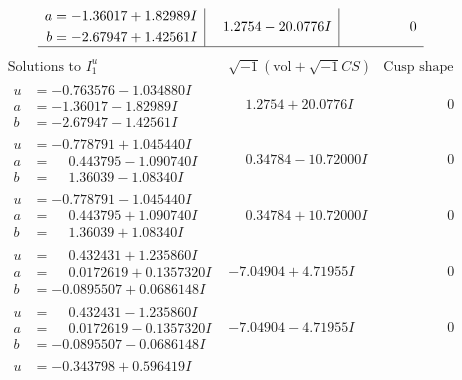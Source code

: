 \documentclass[1p]{elsarticle_modified}
\theoremstyle{definition}
\newcommand{\I}{\sqrt{-1}}
\begin{document}
$$\begin{array}{c|c|c}
\begin{aligned}
a &= -1.36017 + 1.82989 I \\
b &= -2.67947 + 1.42561 I\end{aligned}
 & \phantom{-}1.2754 - 20.0776 I & \phantom{-0.000000 } 0\\
 \hline 
 \end{array}$$\newpage$$\begin{array}{c|c|c}  
\text{Solutions to }I^u_{1}& \I (\text{vol} + \sqrt{-1}CS) & \text{Cusp shape}\\
 \hline 
\begin{aligned}
u &= -0.763576 - 1.034880 I \\
a &= -1.36017 - 1.82989 I \\
b &= -2.67947 - 1.42561 I\end{aligned}
 & \phantom{-}1.2754 + 20.0776 I & \phantom{-0.000000 } 0 \\ \hline\begin{aligned}
u &= -0.778791 + 1.045440 I \\
a &= \phantom{-}0.443795 - 1.090740 I \\
b &= \phantom{-}1.36039 - 1.08340 I\end{aligned}
 & \phantom{-}0.34784 - 10.72000 I & \phantom{-0.000000 } 0 \\ \hline\begin{aligned}
u &= -0.778791 - 1.045440 I \\
a &= \phantom{-}0.443795 + 1.090740 I \\
b &= \phantom{-}1.36039 + 1.08340 I\end{aligned}
 & \phantom{-}0.34784 + 10.72000 I & \phantom{-0.000000 } 0 \\ \hline\begin{aligned}
u &= \phantom{-}0.432431 + 1.235860 I \\
a &= \phantom{-}0.0172619 + 0.1357320 I \\
b &= -0.0895507 + 0.0686148 I\end{aligned}
 & -7.04904 + 4.71955 I & \phantom{-0.000000 } 0 \\ \hline\begin{aligned}
u &= \phantom{-}0.432431 - 1.235860 I \\
a &= \phantom{-}0.0172619 - 0.1357320 I \\
b &= -0.0895507 - 0.0686148 I\end{aligned}
 & -7.04904 - 4.71955 I & \phantom{-0.000000 } 0 \\ \hline\begin{aligned}
u &= -0.343798 + 0.596419 I \\

\end{aligned}
\end{array}$$
\end{document}
